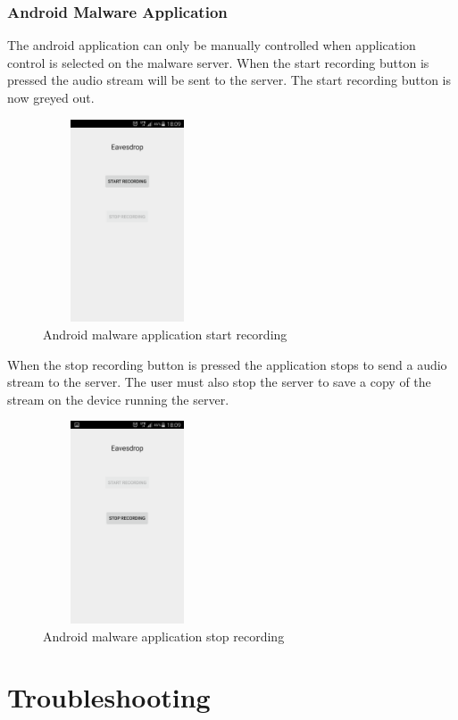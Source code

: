 \documentclass{article}
\begin{document}
\subsubsection{Android Malware Application}
The android application can only be manually controlled when application control is selected on the malware server.
When the start recording button is pressed the audio stream will be sent to the server. The start recording button is now greyed out.
\begin{figure}[H]
\center
\includegraphics[width=5cm, height=6cm]{MalwareScreenshots/StartRecording}
\caption{Android malware application start recording}
\label{fig:my_label11}
\end{figure}
When the stop recording button is pressed the application stops to send a audio stream to the server. The user must also stop the server to save a copy of the stream on the device running the server.
\begin{figure}[H]
\center
\includegraphics[width=5cm, height=6cm]{MalwareScreenshots/StopRecording}
\caption{Android malware application stop recording}
\label{fig:my_label12}
\end{figure}



\newpage
\section{Troubleshooting}
\end{document}
